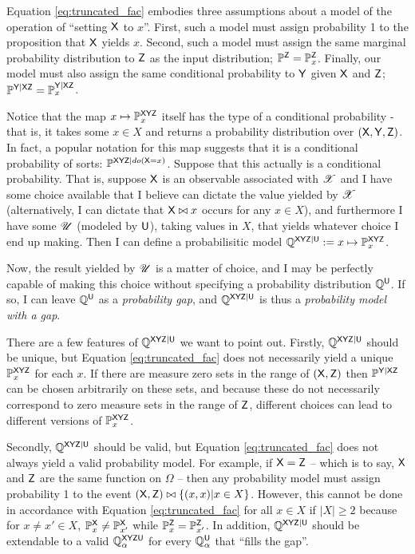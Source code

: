 Equation \ref{eq:truncated_fac} embodies three assumptions about a model of the operation of ``setting $\mathsf{X}$ to $x$''. First, such a model must assign probability 1 to the proposition that $\mathsf{X}$ yields $x$. Second, such a model must assign the same marginal probability distribution to $\mathsf{Z}$ as the input distribution; $\mathbb{P}^{\mathsf{Z}}=\mathbb{P}_{x}^{\mathsf{Z}}$. Finally, our model must also assign the same conditional probability to $\mathsf{Y}$ given $\mathsf{X}$ and $\mathsf{Z}$; $\mathbb{P}^{\mathsf{Y}|\mathsf{XZ}}=\mathbb{P}_x^{\mathsf{Y}|\mathsf{XZ}}$.

Notice that the map $x\mapsto \mathbb{P}^{\mathsf{XYZ}}_x$ itself has the type of a conditional probability - that is, it takes some $x\in X$ and returns a probability distribution over $(\mathsf{X},\mathsf{Y},\mathsf{Z})$. In fact, a popular notation for this map suggests that it is a conditional probability of sorts: $\mathbb{P}^{\mathsf{XYZ}|do(\mathsf{X}=x)}$. Suppose that this actually is a conditional probability. That is, suppose $\mathsf{X}$ is an observable associated with $\mathscr{X}$ and I have some choice available that I believe can dictate the value yielded by $\mathscr{X}$ (alternatively, I can dictate that $\mathsf{X}\bowtie x$ occurs for any $x\in X$), and furthermore I have some $\mathscr{U}$ (modeled by $\mathsf{U}$), taking values in $X$, that yields whatever choice I end up making. Then I can define a probabilisitic model $\mathbb{Q}^{\mathsf{XYZ}|\mathsf{U}}:=x\mapsto \mathbb{P}^{\mathsf{XYZ}}_x$.

Now, the result yielded by $\mathscr{U}$ is a matter of choice, and I may be perfectly capable of making this choice without specifying a probability distribution $\mathbb{Q}^{\mathsf{U}}$. If so, I can leave $\mathbb{Q}^{\mathsf{U}}$ as a \emph{probability gap}, and $\mathbb{Q}^{\mathsf{XYZ}|\mathsf{U}}$ is thus a \emph{probability model with a gap}.

There are a few features of $\mathbb{Q}^{\mathsf{XYZ}|\mathsf{U}}$ we want to point out. Firstly, $\mathbb{Q}^{\mathsf{XYZ}|\mathsf{U}}$ should be unique, but Equation \ref{eq:truncated_fac} does not necessarily yield a unique $\mathbb{P}^{\mathsf{XYZ}}_{x}$ for each $x$. If there are measure zero sets in the range of $(\mathsf{X},\mathsf{Z})$ then $\mathbb{P}^{\mathsf{Y|XZ}}$ can be chosen arbitrarily on these sets, and because these do not necessarily correspond to zero measure sets in the range of $\mathsf{Z}$, different choices can lead to different versions of $\mathbb{P}^{\mathsf{XYZ}}_{x}$.

Secondly, $\mathbb{Q}^{\mathsf{XYZ}|\mathsf{U}}$ should be valid, but Equation \ref{eq:truncated_fac} does not always yield a valid probability model. For example, if $\mathsf{X}=\mathsf{Z}$ -- which is to say, $\mathsf{X}$ and $\mathsf{Z}$ are the same function on $\Omega$ -- then any probability model must assign probability 1 to the event $(\mathsf{X},\mathsf{Z})\bowtie \{(x,x)|x\in X\}$. However, this cannot be done in accordance with Equation \ref{eq:truncated_fac} for all $x\in X$ if $|X|\geq 2$ because for $x\neq x'\in X$, $\mathbb{P}_x^{\mathsf{X}}\neq \mathbb{P}_{x'}^{\mathsf{X}}$ while $\mathbb{P}_x^{\mathsf{Z}}=\mathbb{P}_{x'}^{\mathsf{Z}}$. In addition, $\mathbb{Q}^{\mathsf{XYZ}|\mathsf{U}}$ should be extendable to a valid $\mathbb{Q}_\alpha^{\mathsf{XYZU}}$ for every $\mathbb{Q}_\alpha^{\mathsf{U}}$ that ``fills the gap''.

